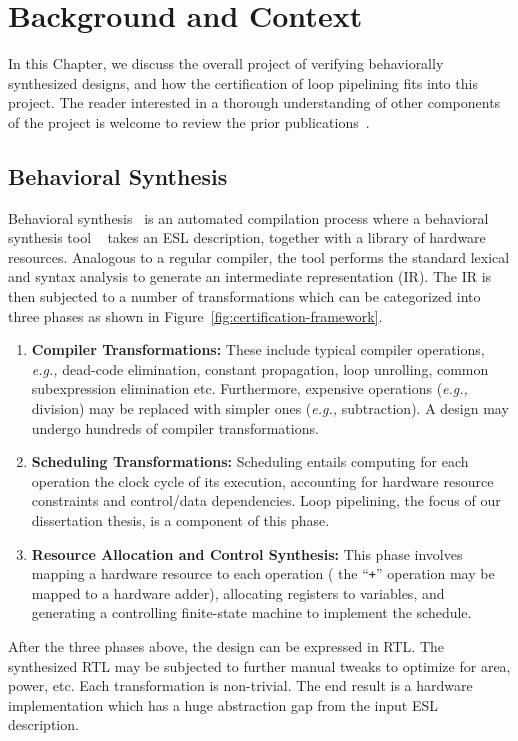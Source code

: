 \chapter{Background and Context}
\label{sec:background}

In this Chapter, we discuss the overall project of verifying behaviorally synthesized
designs, and how the certification of loop pipelining fits into
this project.  The reader interested in a thorough understanding of other
components of the project is welcome to review the prior
publications~\cite{rhcxy:atva-09,hxry:date-10}.

\section{Behavioral Synthesis}

Behavioral synthesis~\cite{lin:survey-97} is an automated compilation process where a behavioral synthesis tool ~\cite{spark,xpilot,legup}  takes an ESL description, together with a library of hardware resources. Analogous to a regular compiler,
the tool performs the standard lexical and syntax analysis to generate an intermediate representation (IR). The IR is then subjected to a number of
transformations which can be categorized into three phases as shown in Figure~\ref{fig:certification-framework}.

 \begin{enumerate}[--]
\item {\bf Compiler Transformations:} These include typical
  compiler operations, {\em e.g.,} dead-code elimination,
  constant propagation, loop unrolling, common subexpression elimination etc.  Furthermore, expensive operations ({\em e.g.,} division) may be replaced with simpler ones ({\em e.g.,} subtraction). A design may
  undergo hundreds of compiler transformations.
\item {\bf Scheduling Transformations:} Scheduling entails
  computing for each operation the clock cycle of its
  execution, accounting for hardware resource constraints
  and control/data dependencies.  Loop pipelining, the focus of our
  dissertation thesis, is a component of this phase.
\item {\bf Resource Allocation and Control Synthesis:} This phase
  involves mapping a hardware resource to each operation (%
the
  ``{\tt +}'' operation may be mapped to a hardware adder), allocating
  registers to variables, and generating a controlling finite-state
  machine to implement the schedule.
\end{enumerate}
After the three phases above, the design can be expressed in
RTL.  The synthesized RTL may be subjected to further manual
tweaks to optimize for area, power, etc. Each transformation is non-trivial. The end result is a hardware 
implementation which has a huge abstraction gap from the input ESL description. 

